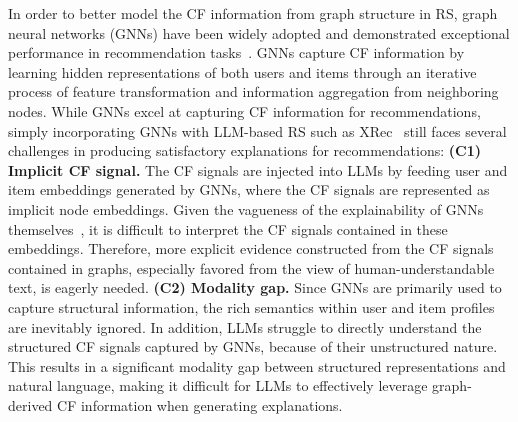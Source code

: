 
In order to better model the CF information from graph structure in RS, graph neural networks (GNNs) have been widely adopted and demonstrated exceptional performance in recommendation tasks~\cite{cao2019unifying,he2020lightgcn,wu2022graph,yang2021dagnn,chen2022learning}. GNNs capture CF information by learning hidden representations of both users and items through an iterative process of feature transformation and information aggregation from neighboring nodes. While GNNs excel at capturing CF information for recommendations, simply incorporating GNNs with LLM-based RS such as XRec~\cite{ma2024xrec} still faces several challenges in producing satisfactory explanations for recommendations: \textbf{(C1) Implicit CF signal.} The CF signals are injected into LLMs by feeding user and item embeddings generated by GNNs, where the CF signals are represented as implicit node embeddings. Given the vagueness of the explainability of GNNs themselves~\cite{yuan2022explainability}, it is difficult to interpret the CF signals contained in these embeddings. Therefore, more explicit evidence constructed from the CF signals contained in graphs, especially favored from the view of human-understandable text, is eagerly needed.  \textbf{(C2) Modality gap.} Since GNNs are primarily used to capture structural information, the rich semantics within user and item profiles are inevitably ignored. In addition, LLMs struggle to directly understand the structured CF signals captured by GNNs, because of their unstructured nature. This results in a significant modality gap between structured representations and natural language, making it difficult for LLMs to effectively leverage graph-derived CF information when generating explanations.

